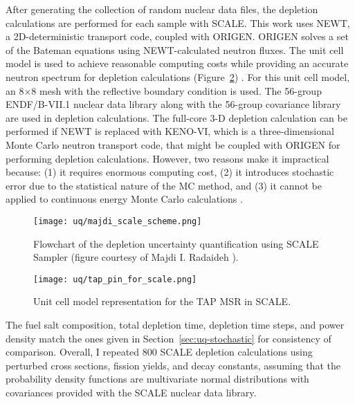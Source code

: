 After generating the collection of random nuclear data files, the depletion 
calculations are performed for each sample with SCALE. This work uses NEWT, a
2D-deterministic transport code, coupled with ORIGEN. ORIGEN solves a set of 
the Bateman equations using NEWT-calculated neutron fluxes. The unit cell 
model is used to achieve reasonable computing costs while providing an 
accurate neutron spectrum for depletion calculations 
(Figure~\ref{fig:uq-tap-pincell}) \cite{betzler_molten_2017, 
rykhlevskii_fuel_2019, betzler_modeling_2020}. For this unit cell model, an 
8$\times$8 mesh with the reflective boundary condition is used. The 56-group 
ENDF/B-VII.1 nuclear data library along with the 56-group covariance library 
are 
used in depletion calculations. The full-core 3-D depletion 
calculation can be performed if NEWT is replaced with KENO-VI, which 
is a three-dimensional Monte Carlo neutron transport code, that might be 
coupled with ORIGEN for performing depletion calculations. However, two 
reasons make it impractical because: 
(1) it requires enormous computing cost, (2) it introduces stochastic error 
due to the statistical nature of the \gls{MC} method, and 
(3) it cannot be applied to continuous energy Monte Carlo calculations 
\cite{rearden_scale_2018}.
\begin{figure}[htp!] %
	\centering
	\texttt{[image: uq/majdi\_scale\_scheme.png]}
	\caption{Flowchart of the depletion uncertainty quantification 
		using SCALE Sampler (figure courtesy of Majdi I. Radaideh 
		\cite{radaideh_novel_2019-1}).}
	\label{fig:uq-sampler}
\end{figure}
	\vspace{-7mm}
\begin{figure}[hbp!] %
	\centering
	\texttt{[image: uq/tap\_pin\_for\_scale.png]}
	\caption{Unit cell model representation for the \gls{TAP} \gls{MSR} in 
	SCALE.}
	\label{fig:uq-tap-pincell}
\end{figure}

The fuel salt composition, total depletion time, depletion time steps, and 
power density match the ones given in Section~\ref{sec:uq-stochastic} for 
consistency of comparison. Overall, I repeated 800 SCALE depletion 
calculations using perturbed cross sections, fission yields, and decay 
constants, assuming that the probability density functions are multivariate 
normal distributions with covariances provided with the SCALE nuclear data 
library.



